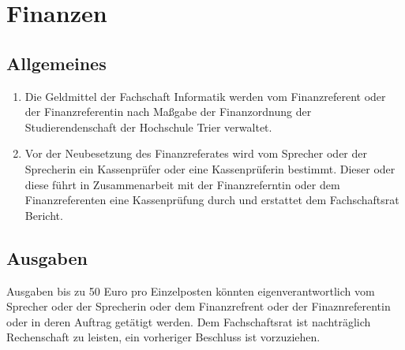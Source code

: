\section{Finanzen}
\subsection{Allgemeines}
\begin{enumerate}
\item Die Geldmittel der Fachschaft Informatik werden vom Finanzreferent oder der Finanzreferentin nach Maßgabe der Finanzordnung der Studierendenschaft der Hochschule Trier verwaltet.
\item Vor der Neubesetzung des Finanzreferates wird vom Sprecher oder der Sprecherin ein Kassenprüfer oder eine Kassenprüferin bestimmt. Dieser oder diese führt in Zusammenarbeit mit der Finanzreferntin oder dem Finanzreferenten eine Kassenprüfung durch und erstattet dem Fachschaftsrat Bericht.
\end{enumerate}

\subsection{Ausgaben}
Ausgaben bis zu 50 Euro pro Einzelposten könnten eigenverantwortlich vom Sprecher oder der Sprecherin oder dem Finanzrefrent oder der Finaznreferentin oder in deren Auftrag getätigt werden. Dem Fachschaftsrat ist nachträglich Rechenschaft zu leisten, ein vorheriger Beschluss ist vorzuziehen.

